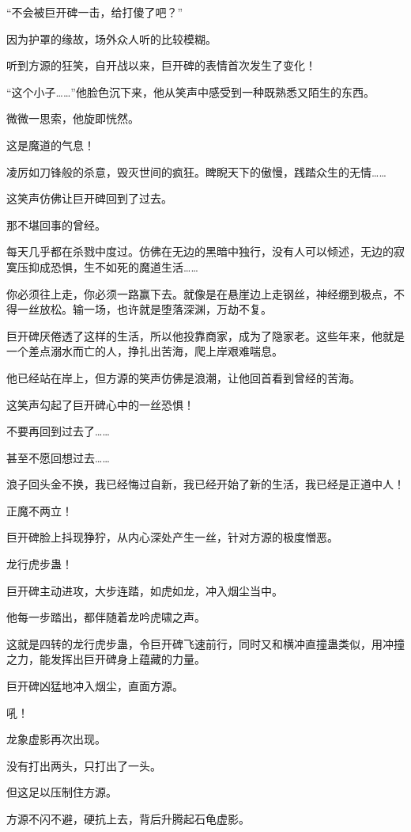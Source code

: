 \begin{this_body}
“不会被巨开碑一击，给打傻了吧？”

因为护罩的缘故，场外众人听的比较模糊。

听到方源的狂笑，自开战以来，巨开碑的表情首次发生了变化！

“这个小子……”他脸色沉下来，他从笑声中感受到一种既熟悉又陌生的东西。

微微一思索，他旋即恍然。

这是魔道的气息！

凌厉如刀锋般的杀意，毁灭世间的疯狂。睥睨天下的傲慢，践踏众生的无情……

这笑声仿佛让巨开碑回到了过去。

那不堪回事的曾经。

每天几乎都在杀戮中度过。仿佛在无边的黑暗中独行，没有人可以倾述，无边的寂寞压抑成恐惧，生不如死的魔道生活……

你必须往上走，你必须一路赢下去。就像是在悬崖边上走钢丝，神经绷到极点，不得一丝放松。输一场，也许就是堕落深渊，万劫不复。

巨开碑厌倦透了这样的生活，所以他投靠商家，成为了隐家老。这些年来，他就是一个差点溺水而亡的人，挣扎出苦海，爬上岸艰难喘息。

他已经站在岸上，但方源的笑声仿佛是浪潮，让他回首看到曾经的苦海。

这笑声勾起了巨开碑心中的一丝恐惧！

不要再回到过去了……

甚至不愿回想过去……

浪子回头金不换，我已经悔过自新，我已经开始了新的生活，我已经是正道中人！

正魔不两立！

巨开碑脸上抖现狰狞，从内心深处产生一丝，针对方源的极度憎恶。

龙行虎步蛊！

巨开碑主动进攻，大步连踏，如虎如龙，冲入烟尘当中。

他每一步踏出，都伴随着龙吟虎啸之声。

这就是四转的龙行虎步蛊，令巨开碑飞速前行，同时又和横冲直撞蛊类似，用冲撞之力，能发挥出巨开碑身上蕴藏的力量。

巨开碑凶猛地冲入烟尘，直面方源。

吼！

龙象虚影再次出现。

没有打出两头，只打出了一头。

但这足以压制住方源。

方源不闪不避，硬抗上去，背后升腾起石龟虚影。


\end{this_body}
